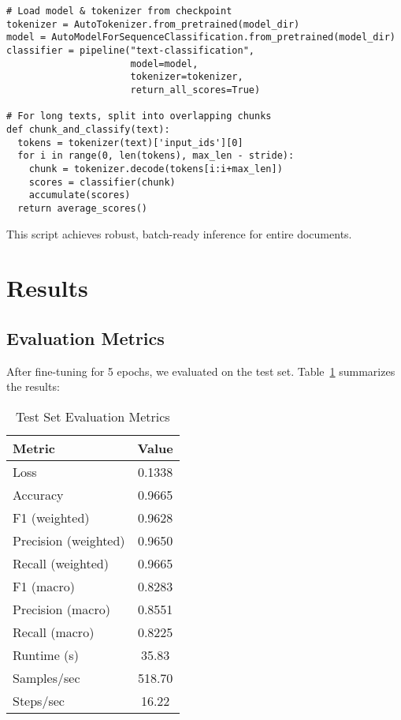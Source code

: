 \documentclass[conference]{IEEEtran}
\begin{document}
\begin{verbatim}
# Load model & tokenizer from checkpoint
tokenizer = AutoTokenizer.from_pretrained(model_dir)
model = AutoModelForSequenceClassification.from_pretrained(model_dir)
classifier = pipeline("text-classification", 
                      model=model, 
                      tokenizer=tokenizer, 
                      return_all_scores=True)

# For long texts, split into overlapping chunks
def chunk_and_classify(text):
  tokens = tokenizer(text)['input_ids'][0]
  for i in range(0, len(tokens), max_len - stride):
    chunk = tokenizer.decode(tokens[i:i+max_len])
    scores = classifier(chunk)
    accumulate(scores)
  return average_scores()
\end{verbatim}

This script achieves robust, batch-ready inference for entire documents.

\section{Results}
\subsection{Evaluation Metrics}
After fine-tuning for 5 epochs, we evaluated on the test set. Table~\ref{tab:eval_metrics} summarizes the results:

\begin{table}[ht]
  \caption{Test Set Evaluation Metrics}
  \label{tab:eval_metrics}
  \centering
  \begin{tabular}{l c}
    \hline
    \textbf{Metric} & \textbf{Value} \\
    \hline
    Loss                  & 0.1338 \\
    Accuracy              & 0.9665 \\
    F1 (weighted)         & 0.9628 \\
    Precision (weighted)  & 0.9650 \\
    Recall (weighted)     & 0.9665 \\
    F1 (macro)            & 0.8283 \\
    Precision (macro)     & 0.8551 \\
    Recall (macro)        & 0.8225 \\
    \hline
    Runtime (s)           & 35.83 \\
    Samples/sec           & 518.70 \\
    Steps/sec             & 16.22 \\
    \hline
  \end{tabular}
\end{table}
\end{document}
